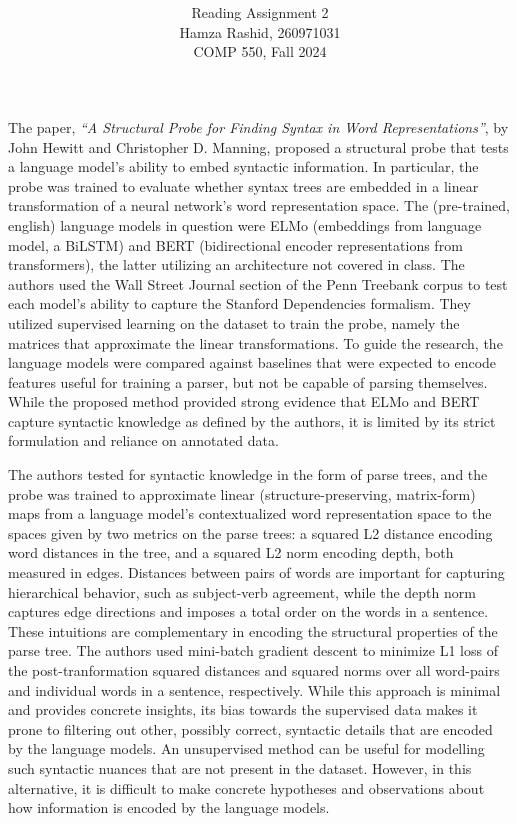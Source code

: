 \documentclass[11pt]{article}
\title{ }
\author{ Reading Assignment 2 \\ Hamza Rashid, 260971031 \\ COMP 550, Fall 2024}
\date{}
\begin{document}
\maketitle

\vspace{-5ex}

The paper, \textit{“A Structural Probe for Finding 
Syntax in Word Representations”}, by John Hewitt and Christopher D. Manning,
proposed a structural probe that tests a
language model's ability to embed syntactic information. In particular,
the probe was trained to evaluate whether syntax trees are 
embedded in a linear transformation of a 
neural network’s word representation space.
The (pre-trained, english) language models in question were ELMo (embeddings from language model, a BiLSTM)
and BERT (bidirectional encoder representations from transformers), 
the latter utilizing an architecture not covered in class. The authors used 
the Wall Street Journal section of the 
Penn Treebank corpus to test each model's ability to capture
the Stanford Dependencies formalism. 
They utilized supervised learning on the dataset
to train the probe, namely the matrices that 
approximate the linear transformations.
To guide the research, the language models
were compared against baselines that were expected to 
encode features useful for training a parser, but not be capable of
parsing themselves. While the proposed method provided strong evidence
that ELMo and BERT capture syntactic knowledge as defined by the authors, 
it is limited by its strict formulation and reliance on annotated data.

The authors tested for syntactic knowledge 
in the form of parse trees, and
the probe was trained to approximate
linear (structure-preserving, matrix-form) maps
from a language model's contextualized word representation space to 
the spaces given by two metrics on the parse trees: 
a squared L2 distance encoding 
word distances in the tree, and
a squared L2 norm encoding depth, 
both measured in edges. Distances between pairs of words
are important for capturing hierarchical behavior, such as subject-verb agreement,
while the depth norm captures edge directions and imposes a total order 
on the words in a sentence. These intuitions are complementary 
in encoding the structural properties of the parse tree.
The authors used mini-batch gradient descent 
to minimize L1 loss of the post-tranformation squared distances and 
squared norms over all word-pairs and individual words in a sentence, respectively.
While this approach is minimal and provides concrete insights,
its bias towards the supervised data makes it prone to filtering
out other, possibly correct, syntactic details that are
encoded by the language models.
An unsupervised method can be useful for modelling such syntactic nuances
that are not present in the dataset. However, in this alternative,
it is difficult to make concrete hypotheses and observations about how
information is encoded by the language models. 
\end{document}
